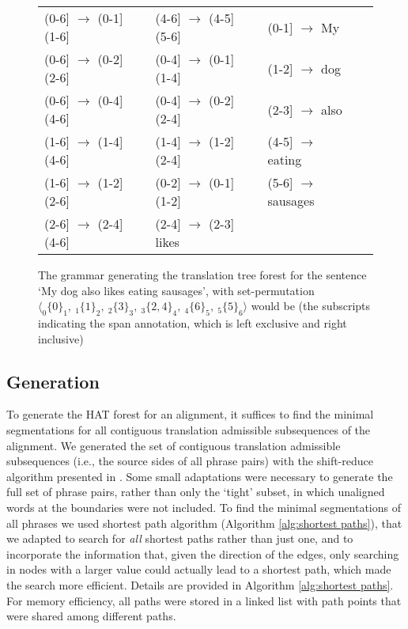 \begin{figure}\begin{framed}
\small{
\begin{tabular}{llllll}
(0-6] $\rightarrow$ (0-1]  (1-6] && (4-6] $\rightarrow$ (4-5]  (5-6] && (0-1] $\rightarrow$ My\\
(0-6] $\rightarrow$ (0-2]  (2-6] && (0-4] $\rightarrow$ (0-1]  (1-4] && (1-2] $\rightarrow$ dog\\
(0-6] $\rightarrow$ (0-4]  (4-6] && (0-4] $\rightarrow$ (0-2]  (2-4] && (2-3] $\rightarrow$ also\\
(1-6] $\rightarrow$ (1-4]  (4-6] && (1-4] $\rightarrow$ (1-2]  (2-4] && (4-5] $\rightarrow$ eating\\
(1-6] $\rightarrow$ (1-2]  (2-6] && (0-2] $\rightarrow$ (0-1]  (1-2] && (5-6] $\rightarrow$ sausages\\
(2-6] $\rightarrow$ (2-4]  (4-6] && (2-4] $\rightarrow$ (2-3] likes\\
\end{tabular}
\caption{The grammar generating the translation tree forest for the sentence
`My dog also likes eating sausages', with set-permutation $\langle _0\{0\}_1,~ _1\{1\}_2,~ _2\{3\}_3,~ _3\{2,4\}_4, ~_4\{6\}_5,~ _5\{5\}_6\rangle$ would be (the subscripts indicating the span annotation, which is left exclusive and right inclusive)}\label{fig:grammar}
}
\end{framed}
\end{figure}

\subsection{Generation}
To generate the HAT forest for an alignment, it suffices to find the minimal segmentations for all contiguous translation admissible subsequences of the alignment. We generated the set of contiguous translation admissible subsequences (i.e., the source sides of all phrase pairs) with the shift-reduce algorithm presented in \cite{zhang2008extracting}. Some small adaptations were necessary to generate the full set of phrase pairs, rather than only the `tight' subset, in which unaligned words at the boundaries were not included. To find the minimal segmentations of all phrases we used  shortest path algorithm (Algorithm \ref{alg:shortest paths}), that we adapted to search for \textit{all} shortest paths rather than just one, and to incorporate the information that, given the direction of the edges, only searching in nodes with a larger value could actually lead to a shortest path, which made the search more efficient. Details are provided in Algorithm \ref{alg:shortest paths}. For memory efficiency, all paths were stored in a linked list with path points that were shared among different paths.

